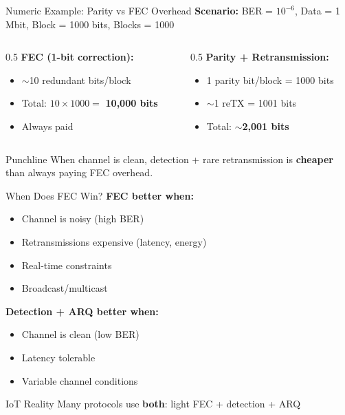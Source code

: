 \documentclass[aspectratio=169,11pt]{beamer}
\begin{document}
\begin{frame}{Numeric Example: Parity vs FEC Overhead}
    \textbf{Scenario:} BER = $10^{-6}$, Data = 1 Mbit, Block = 1000 bits, Blocks = 1000
    
    \vspace{0.3cm}
    \begin{columns}[T]
        \begin{column}{0.5\textwidth}
            \textbf{FEC (1-bit correction):}
            \begin{itemize}
                \item $\sim$10 redundant bits/block
                \item Total: $10 \times 1000 = $ \textbf{10,000 bits}
                \item Always paid
            \end{itemize}
        \end{column}
        \begin{column}{0.5\textwidth}
            \textbf{Parity + Retransmission:}
            \begin{itemize}
                \item 1 parity bit/block = 1000 bits
                \item $\sim$1 reTX = 1001 bits
                \item Total: $\sim$\textbf{2,001 bits}
            \end{itemize}
        \end{column}
    \end{columns}
    
    \vspace{0.3cm}
    \begin{alertblock}{Punchline}
        When channel is clean, detection + rare retransmission is \textbf{cheaper} than always paying FEC overhead.
    \end{alertblock}
\end{frame}

\begin{frame}{When Does FEC Win?}
    \textbf{FEC better when:}
    \begin{itemize}
        \item Channel is noisy (high BER)
        \item Retransmissions expensive (latency, energy)
        \item Real-time constraints
        \item Broadcast/multicast
    \end{itemize}
    
    \textbf{Detection + ARQ better when:}
    \begin{itemize}
        \item Channel is clean (low BER)
        \item Latency tolerable
        \item Variable channel conditions
    \end{itemize}
    
    \begin{block}{IoT Reality}
        Many protocols use \textbf{both}: light FEC + detection + ARQ
    \end{block}
\end{frame}
\end{document}
